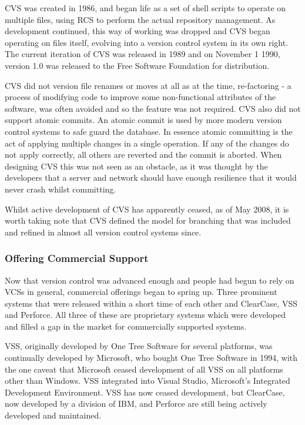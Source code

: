 CVS was created in 1986, and began life as a set of shell scripts to operate on multiple files, using RCS to perform the actual repository management.
As development continued, this way of working was dropped and CVS began operating on files itself, evolving into a version control system in its own right.
The current iteration of CVS was released in 1989 and on November 1 1990, version 1.0 was released to the Free Software Foundation for distribution.

CVS did not version file renames or moves at all as at the time, re-factoring - a process of modifying code to improve some non-functional attributes of the software, was often avoided and so the feature was not required.
CVS also did not support atomic commits.
An atomic commit is used by more modern version control systems to safe guard the database.
In essence atomic committing is the act of applying multiple changes in a single operation.
If any of the changes do not apply correctly, all others are reverted and the commit is aborted.
When designing CVS this was not seen as an obstacle, as it was thought by the developers that a server and network should have enough resilience that it would never crash whilst committing.

Whilst active development of CVS has apparently ceased, as of May 2008, it is worth taking note that CVS defined the model for branching that was included and refined in almost all version control systems since.

\subsubsection{Offering Commercial Support}
Now that version control was advanced enough and people had begun to rely on VCSs in general, commercial offerings began to spring up.
Three prominent systems that were released within a short time of each other and ClearCase, VSS and Perforce.
All three of these are proprietary systems which were developed and filled a gap in the market for commercially supported systems.

VSS, originally developed by One Tree Software for several platforms, was continually developed by Microsoft, who bought One Tree Software in 1994, with the one caveat that Microsoft ceased development of all VSS on all platforms other than Windows.
VSS integrated into Visual Studio, Microsoft's Integrated Development Environment.
VSS has now ceased development, but ClearCase, now developed by a division of IBM, and Perforce are still being actively developed and maintained.

